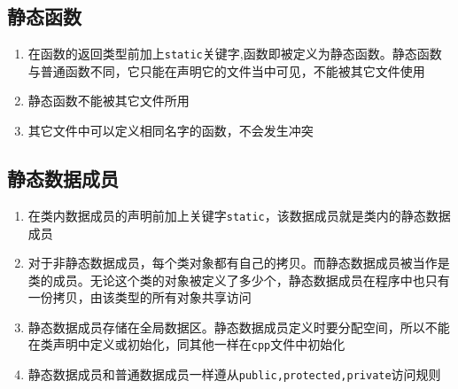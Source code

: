 \documentclass[UTF8,a4paper,12pt]{ctexbook} %
\begin{document}
	\subsection{静态函数}
		       \begin{enumerate}[fullwidth,itemindent=2em,label=(\arabic*)]
			       \item  在函数的返回类型前加上\verb|static|关键字,函数即被定义为静态函数。静态函数与普通函数不同，它只能在声明它的文件当中可见，不能被其它文件使用
		       
			       \item  静态函数不能被其它文件所用
		       
			       \item  其它文件中可以定义相同名字的函数，不会发生冲突
		       \end{enumerate}
	\subsection{静态数据成员}
		       \begin{enumerate}[fullwidth,itemindent=2em,label=(\arabic*)]
			       \item  在类内数据成员的声明前加上关键字\verb|static|，该数据成员就是类内的静态数据成员
			       
			       \item  对于非静态数据成员，每个类对象都有自己的拷贝。而静态数据成员被当作是类的成员。无论这个类的对象被定义了多少个，静态数据成员在程序中也只有一份拷贝，由该类型的所有对象共享访问
			       
			       \item  静态数据成员存储在全局数据区。静态数据成员定义时要分配空间，所以不能在类声明中定义或初始化，同其他一样在\verb|cpp|文件中初始化
			       
			       \item  静态数据成员和普通数据成员一样遵从\verb|public,protected,private|访问规则
		       \end{enumerate}
		       
\end{document}
